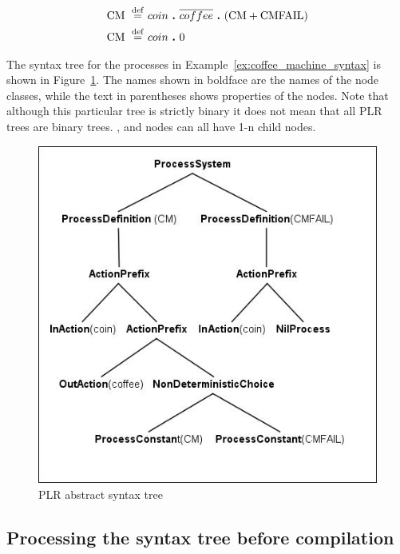 	\begin{Exa}
	\label{ex:coffee_machine_syntax}
	\begin{align*}
			\mathrm{CM} \ \stackrel{\mathrm{def}}{=}\  & coin \ \textbf{.}\  \overline{coffee} \ \textbf{.}\  (\mathrm{CM}+\mathrm{CMFAIL})\\
			\mathrm{CM} \ \stackrel{\mathrm{def}}{=}\  & coin \ \textbf{.}\  \mathrm{0}
	\end{align*}	
	\end{Exa}

	The syntax tree for the processes in Example~\ref{ex:coffee_machine_syntax} 
	is shown in Figure~\ref{fig:syntax_tree_example}. The names shown in 
	boldface are the names of the node classes, while the text in 
	parentheses shows properties of the nodes. Note that although this 
	particular tree is strictly binary it does not mean that all PLR trees
	are binary trees. ,  and 
	 nodes can all have 1-n child nodes.
	
	
	\begin{figure}[h!]
		\centering
		\includegraphics[scale=0.7]{syntax_tree_example.jpg}
		\caption{PLR abstract syntax tree}
		\label{fig:syntax_tree_example}
	\end{figure}
 	

\subsection{Processing the syntax tree before compilation}\label{sec:visitor}
	
